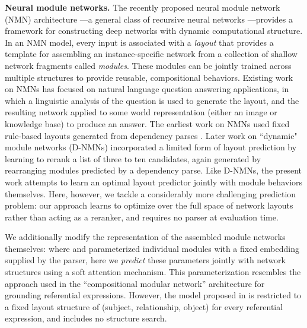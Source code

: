 \documentclass[10pt,twocolumn,letterpaper]{article}
\newcommand{\myparagraph}[1]{\noindent\textbf{#1}}
\begin{document}
\myparagraph{Neural module networks.} The recently proposed neural module network (NMN) architecture \cite{andreas16neural}---a general class of recursive neural networks \cite{socher2013recursive}---provides a framework for constructing deep networks with dynamic computational structure. In an NMN model, every input is associated with a \emph{layout} that provides a template for assembling an instance-specific network from a collection of shallow network fragments called \emph{modules}. These modules can be jointly trained across multiple structures to provide reusable, compositional behaviors. Existing work on NMNs has focused on natural language question answering applications, in which a linguistic analysis of the question is used to generate the layout, and the resulting network applied to some world representation (either an image or knowledge base) to produce an answer. The earliest work on NMNs \cite{andreas16neural} used fixed rule-based layouts generated from dependency parses \cite{zhu2013fast}. Later work on ``dynamic" module networks (D-NMNs) \cite{andreas2016learning} incorporated a limited form of layout prediction by learning to rerank a list of three to ten candidates, again generated by rearranging modules predicted by a dependency parse. Like D-NMNs, the present work attempts to learn an optimal layout predictor jointly with module behaviors themselves. Here, however, we tackle a considerably more challenging prediction problem: our approach learns to  optimize over the full space of network layouts rather than acting as a reranker, and requires no parser at evaluation time.

We additionally modify the representation of the assembled module networks themselves: where \cite{andreas16neural} and \cite{andreas2016learning} parameterized individual modules with a fixed embedding supplied by the parser, here we \emph{predict} these parameters jointly with network structures using a soft attention mechanism. This parameterization resembles the approach used in the ``compositional modular network'' architecture \cite{hu2017modeling} for grounding referential expressions. However, the model proposed in \cite{hu2017modeling} is restricted to a fixed layout structure of (subject, relationship, object) for every referential expression, and includes no structure search.
\end{document}

